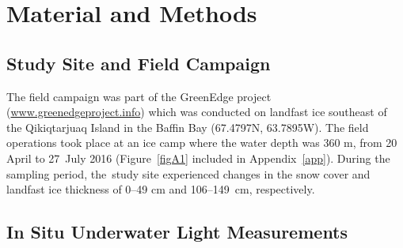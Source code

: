 \documentclass[applsci,article,accept,moreauthors,pdftex,10pt,a4paper]{Definitions/mdpi}
\begin{document}
\section{Material and Methods}
\unskip
\subsection{Study Site and Field Campaign}

The field campaign was part of the GreenEdge project (\url{www.greenedgeproject.info}) which was conducted on landfast ice southeast of the Qikiqtarjuaq Island in the Baffin Bay (67.4797N, 63.7895W). The field operations took place at an ice camp where the water depth was 360 m, from 20 April  to 27~July  2016 (Figure~\ref{figA1} included in  Appendix~\ref{app}). During the sampling period, the~study site experienced changes in the snow cover and landfast ice thickness of 0--49 cm and 106--149~cm, respectively.

\subsection{In Situ Underwater Light Measurements}
\end{document}
